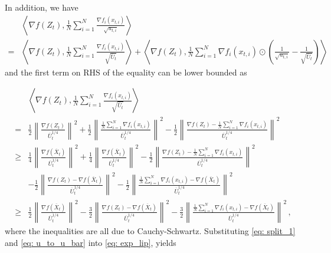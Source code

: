 \documentclass[11pt]{article}
\begin{document}
In addition, we have 
\begin{align}\label{eq: u_to_u_bar}
&\left \langle \nabla f( Z_{t}), \frac{1}{N} \sum_{i=1}^N \frac{\nabla f_i(x_{t,i})}{\sqrt{u_{t,i}}}  \right \rangle  \nonumber \\
= &  \left \langle \nabla f( Z_{t}), \frac{1}{N} \sum_{i=1}^N \frac{\nabla f_i( x_{t,i})}{\sqrt{\overline U_{t}}}  \right \rangle  +\left \langle \nabla f( Z_{t}), \frac{1}{N} \sum_{i=1}^N \nabla f_i( x_{t,i})\odot \left(\frac{1}{\sqrt{u_{t,i}}} - \frac{1}{\sqrt{\overline U_{t}}}  \right)  \right \rangle 
\end{align}
and the first term on RHS of the equality can be lower bounded as 
\newpage

\begin{align} \label{eq: split_1}
&\left \langle \nabla f( Z_{t}), \frac{1}{N} \sum_{i=1}^N \frac{\nabla f_i( x_{t,i})}{\sqrt{\overline U_{t}}}  \right \rangle \nonumber \\
= &\frac{1}{2} \left\|\frac{\nabla f( Z_{t})}{\overline U_{t}^{1/4}}\right\|^2 + \frac{1}{2}\left\|  \frac{\frac{1}{N}\sum_{i=1}^N \nabla f_i( x_{t,i}) }{\overline U_{t}^{1/4}}  \right\|^2 - \frac{1}{2 }\left\| \frac{\nabla f( Z_{t}) -\frac{1}{N}\sum_{i=1}^N \nabla f_i( x_{t,i})}{\overline U_{t}^{1/4}} \right\|^2 \nonumber \\
\geq & \frac{1}{4} \left\|\frac{\nabla f( \overline X_{t})}{\overline U_{t}^{1/4}}\right\|^2 + \frac{1}{4}\left\|  \frac{ \nabla f( \overline X_{t})}{\overline U_{t}^{1/4}}  \right\|^2 - \frac{1}{2 }\left\| \frac{\nabla f( Z_{t}) -\frac{1}{N}\sum_{i=1}^N \nabla f_i( x_{t,i})}{\overline U_{t}^{1/4}} \right\|^2  \nonumber \\
&- \frac{1}{2} \left\|\frac{\nabla f( Z_{t}) -\nabla f( \overline X_{t})}{\overline U_{t}^{1/4}}\right\|^2 - \frac{1}{2} \left\|  \frac{ \frac{1}{N}\sum_{i=1}^N \nabla f_i( x_{t,i}) -  \nabla f( \overline X_{t})}{\overline U_{t}^{1/4}}  \right\|^2 \nonumber \\
\geq & \frac{1}{2} \left\|\frac{\nabla f( \overline X_{t})}{\overline U_{t}^{1/4}}\right\|^2   - \frac{3}{2} \left\|\frac{\nabla f( Z_{t}) -\nabla f( \overline X_{t})}{\overline U_{t}^{1/4}}\right\|^2 - \frac{3}{2} \left\|  \frac{ \frac{1}{N}\sum_{i=1}^N \nabla f_i( x_{t,i}) -  \nabla f( \overline X_{t})}{\overline U_{t}^{1/4}}  \right\|^2 \, ,
\end{align}
where the inequalities are all due to Cauchy-Schwartz.
Substituting \eqref{eq: split_1} and \eqref{eq: u_to_u_bar} into \eqref{eq: exp_lip}, yields
\end{document}
